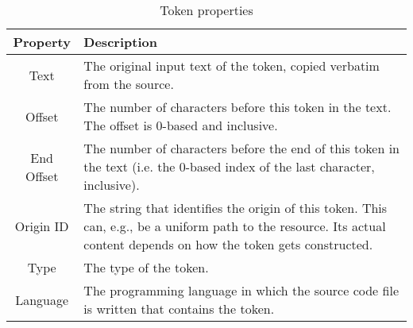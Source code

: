 \setlength{\extrarowheight}{.5em}
\begin{table}
	\caption{Token properties}
	\label{table:tokenProperties}
	\begin{tabularx}{\textwidth}{c|L}
		\textbf{Property} & \textbf{Description} \\
		\hline
		Text & The original input text of the token, copied verbatim from the source. \\
		Offset & The number of characters before this token in the text. The offset is 0-based and inclusive. \\
		End Offset & The number of characters before the end of this token in the text (i.e. the 0-based index of the last character, inclusive). \\
		Origin ID & The string that identifies the origin of this token. This can, e.g., be a uniform path to the resource. Its actual content depends on how the token gets constructed. \\
		Type & The type of the token. \\
		Language & The programming language in which the source code file is written that contains the token.		
	\end{tabularx}
\end{table}
\setlength{\extrarowheight}{0em}